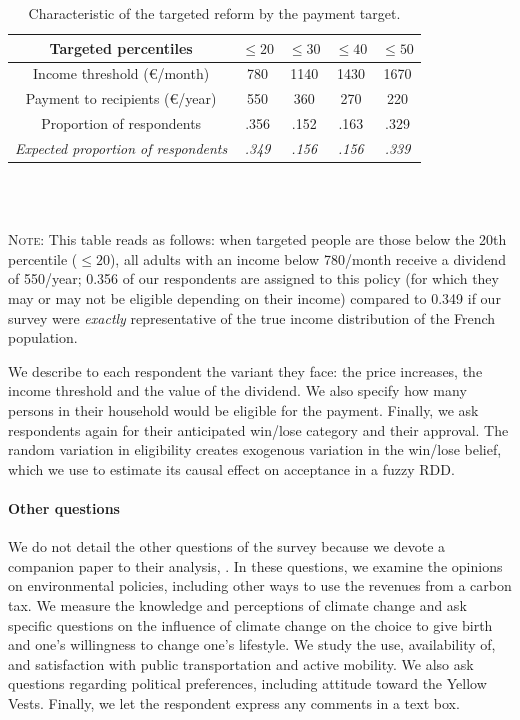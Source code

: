 \documentclass[12pt]{article} %
\begin{document}
\begin{table}[H]
\caption{\label{tab:Compensation-amount-by}Characteristic of the targeted
reform by the payment target.}
\centering%
\begin{tabular}{ccccc}
\hline 
\hline 
Targeted percentiles & $\leq20$ & $\leq30$ & $\leq40$ & $\leq50$\tabularnewline
\hline 
Income threshold (\euro{}/month) & 780 & 1140 & 1430 & 1670\tabularnewline
Payment to recipients (\euro{}/year) & 550 & 360 & 270 & 220\tabularnewline
Proportion of respondents & .356 & .152 & .163 & .329\tabularnewline
\emph{Expected proportion of respondents} & \emph{.349} & \emph{.156} & \emph{.156} & \emph{.339}\tabularnewline
\hline 
\hline 
\end{tabular}
\\ \quad \\ {\footnotesize \parbox[t]{.94\textwidth}{\linespread{1.2}\selectfont \textsc{Note:}  This table reads as follows: when targeted people are those below the 20th percentile ($\leq 20$), all adults with an income below 780\euros{}/month receive a dividend of 550\euros{}/year; 0.356 of our respondents are assigned to this policy (for which they may or may not be eligible depending on their income) compared to 0.349 if our survey were \textit{exactly} representative of the true income distribution of the French population. }}
\end{table}


We describe to each respondent the variant they face: the price increases, the income threshold and the value of the dividend. We also specify how many persons in their household would be eligible for the payment. Finally, we ask respondents again for their anticipated win/lose category and their approval. The random variation in eligibility creates exogenous variation in the win/lose belief, which we use to estimate its causal effect on acceptance in a fuzzy RDD.



\paragraph{Other questions}

We do not detail the other questions of the survey because we devote a companion paper to their analysis, \citet{douenne_french_2019}. In these questions, we examine the opinions on environmental policies, including other ways to use the revenues from a carbon tax. We measure the knowledge and perceptions of climate change and ask specific questions on the influence of climate change on the choice to give birth and one's willingness to change one's lifestyle. We study the use, availability of, and satisfaction with public transportation and active mobility. We also ask questions regarding political preferences, including attitude toward the Yellow Vests. Finally, we let the respondent express any comments in a text box.
\end{document}

